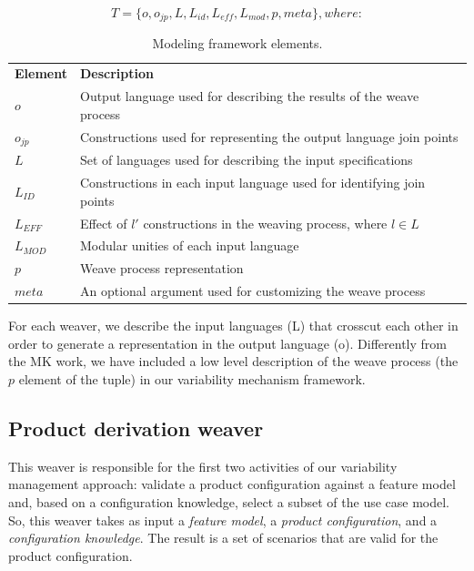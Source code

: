 \documentclass{acm_proc_article-sp}
\begin{document}
\begin{equation}
T = \{o, o_{jp}, L, L_{id}, L_{eff}, L_{mod}, p, meta\}, where:
\label{eq:tuple}
\end{equation}

\begin{table}[h]
\begin{center}
\begin{small}
\caption{Modeling framework elements.} \label{tab:tup-01}
\begin{tabular}{ll}
  \hline\noalign{\smallskip}
  {\bf Element} & {\bf Description} \\ 
  \noalign{\smallskip}
  \hline
  \noalign{\smallskip}
  $o$              & Output language used for describing the results of the weave process \\ 
  $o_{jp}$       & Constructions used for representing the output language join points \\ 
  $L$              & Set of languages used for describing the input specifications \\ 
  $L_{ID}$      & Constructions in each input language used for identifying join points \\ 
  $L_{EFF}$   & Effect of $l'$ constructions in the weaving process, where $l \in L$ \\ 
  $L_{MOD}$  & Modular unities of each input language \\ 
  $p$               & Weave process representation \\ 
  $meta$         & An optional argument used for customizing the weave process \\ 
  \hline
\end{tabular}
\end{small}
\end{center}
\end{table}

For each weaver, we describe the input languages (L) that crosscut each other in order to generate 
a representation in the output language (o). Differently from the MK work, we have included a 
low level description of the weave process (the $p$ element of the tuple) in our variability 
mechanism framework. 

\subsection{Product derivation weaver}\label{sub:pd-weaver}

This weaver is responsible for the first two activities of our 
variability management approach: validate a product configuration 
against  a feature model and, based on a configuration knowledge, select 
a subset of the use case model. So, this weaver takes as input a
\emph{feature model}, a \emph{product configuration}, and a \emph{configuration knowledge}.
The result is a set of scenarios that are valid for the product configuration.
\end{document}
